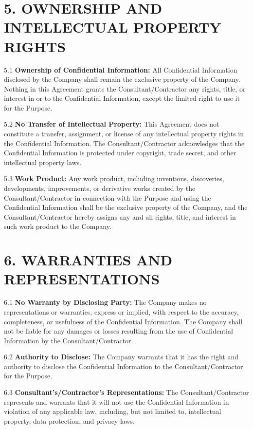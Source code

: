 \documentclass[12pt]{article}
\begin{document}
\section*{5. OWNERSHIP AND INTELLECTUAL PROPERTY RIGHTS}

5.1 \textbf{Ownership of Confidential Information:} All Confidential Information disclosed by the Company shall remain the exclusive property of the Company. Nothing in this Agreement grants the Consultant/Contractor any rights, title, or interest in or to the Confidential Information, except the limited right to use it for the Purpose.

5.2 \textbf{No Transfer of Intellectual Property:} This Agreement does not constitute a transfer, assignment, or license of any intellectual property rights in the Confidential Information. The Consultant/Contractor acknowledges that the Confidential Information is protected under copyright, trade secret, and other intellectual property laws.

5.3 \textbf{Work Product:} Any work product, including inventions, discoveries, developments, improvements, or derivative works created by the Consultant/Contractor in connection with the Purpose and using the Confidential Information shall be the exclusive property of the Company, and the Consultant/Contractor hereby assigns any and all rights, title, and interest in such work product to the Company.

\section*{6. WARRANTIES AND REPRESENTATIONS}

6.1 \textbf{No Warranty by Disclosing Party:} The Company makes no representations or warranties, express or implied, with respect to the accuracy, completeness, or usefulness of the Confidential Information. The Company shall not be liable for any damages or losses resulting from the use of Confidential Information by the Consultant/Contractor.

6.2 \textbf{Authority to Disclose:} The Company warrants that it has the right and authority to disclose the Confidential Information to the Consultant/Contractor for the Purpose.

6.3 \textbf{Consultant’s/Contractor’s Representations:} The Consultant/Contractor represents and warrants that it will not use the Confidential Information in violation of any applicable law, including, but not limited to, intellectual property, data protection, and privacy laws.
\end{document}
